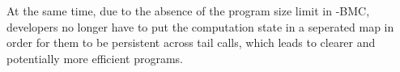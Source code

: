 

At the same time, due to the absence of the program size limit in \projname{}-BMC,
    developers no longer have to put the computation state in a seperated map
    in order for them to be persistent across tail calls, which leads
    to clearer and potentially more efficient programs.

